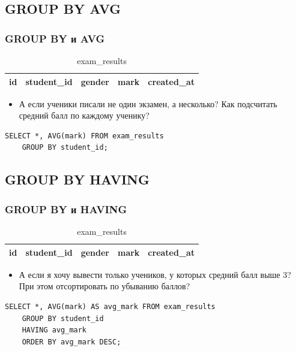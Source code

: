 \documentclass[compress,red]{beamer}
\begin{document}
\subsection{GROUP BY AVG}
\begin{frame}[fragile]
  \frametitle{GROUP BY и AVG}
  \begin{table}
    \begin{tabular}{|c|c|c|c|c|}
      \hline
      id & student\_id & gender & mark & created\_at\\
      \hline
    \end{tabular}
    \caption{exam\_results}
  \end{table}
  \begin{itemize}
    \item А если ученики писали не один экзамен, а несколько? Как подсчитать средний балл по каждому ученику?
  \end{itemize}
  \scriptsize{
  \begin{lstlisting}[label=sql7,caption=GROUP BY AVG]
    SELECT *, AVG(mark) FROM exam_results
    GROUP BY student_id;
  \end{lstlisting}
  }
\end{frame}

\subsection{GROUP BY HAVING}
\begin{frame}[fragile]
  \frametitle{GROUP BY и HAVING}
  \begin{table}
    \begin{tabular}{|c|c|c|c|c|}
      \hline
      id & student\_id & gender & mark & created\_at\\
      \hline
    \end{tabular}
    \caption{exam\_results}
  \end{table}
  \begin{itemize}
    \item А если я хочу вывести только учеников, у которых средний балл выше 3? При этом отсортировать по убыванию баллов?
  \end{itemize}
  \scriptsize{
  \begin{lstlisting}[label=sql8,caption=GROUP BY HAVING]
    SELECT *, AVG(mark) AS avg_mark FROM exam_results
    GROUP BY student_id
    HAVING avg_mark
    ORDER BY avg_mark DESC;
  \end{lstlisting}
  }
\end{frame}
\end{document}
